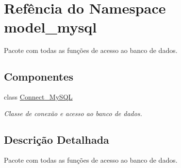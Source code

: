 \hypertarget{namespacemodel__mysql}{\section{\-Refência do \-Namespace model\-\_\-mysql}
\label{namespacemodel__mysql}
}


\-Pacote com todas as funções de acesso ao banco de dados.  


\subsection*{\-Componentes}
\begin{DoxyCompactItemize}
\item 
class \hyperlink{classmodel__mysql_1_1Connect__MySQL}{\-Connect\-\_\-\-My\-S\-Q\-L}
\begin{DoxyCompactList}\small\item\em \-Classe de conexão e acesso ao banco de dados. \end{DoxyCompactList}\end{DoxyCompactItemize}


\subsection{\-Descrição \-Detalhada}
\-Pacote com todas as funções de acesso ao banco de dados. 